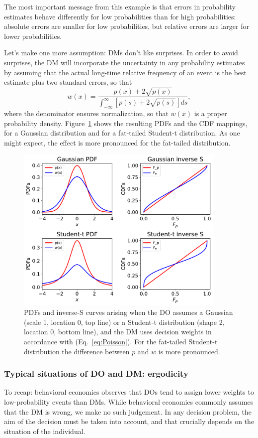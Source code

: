 \documentclass[a4paper, 12pt]{article}
\newcommand{\elabel}[1]{\label{eq:#1}}
\newcommand{\eref}[1]{(Eq.~\ref{eq:#1})}
\newcommand{\flabel}[1]{\label{fig:#1}}
\newcommand{\Fref}[1]{Figure~\ref{fig:#1}}
\newcommand{\be}{\begin{equation}}
\newcommand{\ee}{\end{equation}}
\begin{document}
The most important message from this example is that errors in probability estimates behave differently for low probabilities than for high probabilities: absolute errors are smaller for low probabilities, but relative errors are larger for lower probabilities. 

Let's make one more assumption: DMs don't like surprises. In order to avoid surprises, the DM will incorporate the uncertainty in any probability estimates by assuming that the actual long-time relative frequency of an event is the best estimate plus two standard errors, so that
\be
w(x)=\frac{p(x)+2 \sqrt{p(x)}}{\int_{-\infty}^{\infty}[p(s)+2 \sqrt{p(s)}] ds},
\elabel{Poisson}
\ee
where the denominator ensures normalization, so that $w(x)$ is a proper probability density. \Fref{square_root_error} shows the resulting PDFs and the CDF mappings, for a Gaussian distribution and for a fat-tailed Student-t distribution. As one might expect, the effect is more pronounced for the fat-tailed distribution.
\begin{figure}[htb]
\centering
\includegraphics[width=0.9\textwidth]{./figs/square_root_error.pdf}
\caption{PDFs and inverse-S curves arising when the DO assumes a Gaussian (scale 1, location 0, top line) or a Student-t distribution (shape 2, location 0, bottom line), and the DM uses decision weights in accordance with \eref{Poisson}. For the fat-tailed Student-t distribution the difference between $p$ and $w$ is more pronounced.}
\flabel{square_root_error}
\end{figure}

\FloatBarrier
\subsubsection{Typical situations of DO and DM: ergodicity}
To recap: behavioral economics observes that DOs tend to assign lower weights to low-probability events than DMs.
While behavioral economics commonly assumes that the DM is wrong, we make no such judgement. In any decision problem, the aim of the decision must be taken into account, and that crucially depends on the situation of the individual. 
\end{document}
